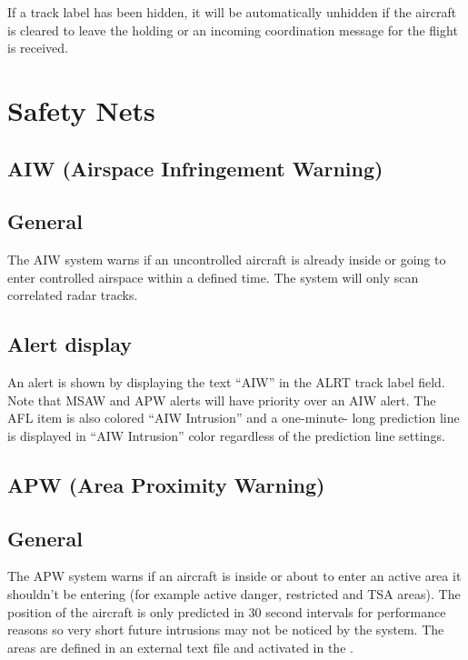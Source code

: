 \documentclass[11pt,a4paper,oldfontcommands]{memoir}
\begin{document}
If a track label has been hidden, it will be automatically unhidden if the aircraft is cleared to leave the holding or an incoming coordination message for the flight is received.

\section{Safety Nets}

\subsection{AIW (Airspace Infringement Warning)}

\subsection*{General}

The AIW system warns if an uncontrolled aircraft is already inside or going to enter controlled airspace within a defined time. The system will only scan correlated radar tracks.

\subsection*{Alert display}

An alert is shown by displaying the text “AIW” in the ALRT track label field. Note that MSAW and APW alerts will have priority over an AIW alert. The AFL item is also colored “AIW Intrusion” and a one-minute- long prediction line is displayed in “AIW Intrusion” color regardless of the prediction line settings.


\subsection{APW (Area Proximity Warning)}

\subsection*{General}

The APW system warns if an aircraft is inside or about to enter an active area it shouldn’t be entering (for example active danger, restricted and TSA areas). The position of the aircraft is only predicted in 30 second intervals for performance reasons so very short future intrusions may not be noticed by the system. The areas are defined in an external text file and activated in the \textit{}.
\end{document}
